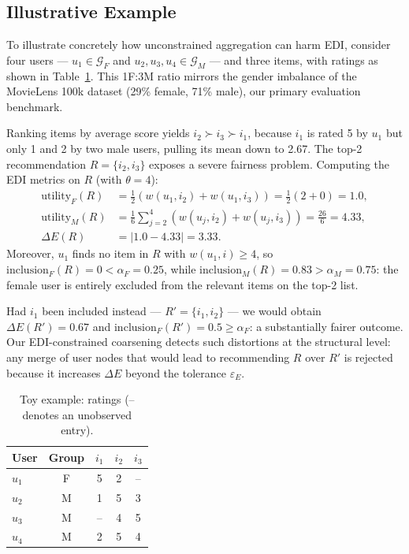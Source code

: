 \documentclass[a4paper,fleqn]{cas-dc}
\begin{document}
\subsection{Illustrative Example}

To illustrate concretely how unconstrained aggregation can harm EDI, consider
four users — $u_1 \in \mathcal{G}_F$ and $u_2, u_3, u_4 \in \mathcal{G}_M$
— and three items, with ratings as shown in Table~\ref{tab:toy}. This 1F:3M ratio mirrors the gender imbalance of the MovieLens 100k dataset
(29\% female, 71\% male), our primary evaluation benchmark.


Ranking items by average score yields $i_2 \succ i_3 \succ i_1$, because $i_1$
is rated 5 by $u_1$ but only 1 and 2 by two male users, pulling its mean down
to 2.67. The top-2 recommendation $R = \{i_2, i_3\}$ exposes a severe fairness
problem. Computing the EDI metrics on $R$ (with $\theta = 4$):
\begin{align*}
  \mathrm{utility}_F(R) &= \tfrac{1}{2}(w(u_1,i_2)+w(u_1,i_3))
                         = \tfrac{1}{2}(2+0) = 1.0, \\
  \mathrm{utility}_M(R) &= \tfrac{1}{6}\sum_{j=2}^{4}(w(u_j,i_2)+w(u_j,i_3))
                         = \tfrac{26}{6} = 4.33, \\
  \Delta E(R) &= |1.0 - 4.33| = 3.33.
\end{align*}
Moreover, $u_1$ finds no item in $R$ with $w(u_1,i) \geq 4$, so
$\mathrm{inclusion}_F(R) = 0 < \alpha_F = 0.25$, while
$\mathrm{inclusion}_M(R) = 0.83 > \alpha_M = 0.75$: the female user is
entirely excluded from the relevant items on the top-2 list.

Had $i_1$ been included instead — $R' = \{i_1, i_2\}$ — we would obtain
$\Delta E(R') = 0.67$ and $\mathrm{inclusion}_F(R') = 0.5 \geq \alpha_F$: a
substantially fairer outcome. Our EDI-constrained coarsening detects such
distortions at the structural level: any merge of user nodes that would lead
to recommending $R$ over $R'$ is rejected because it increases $\Delta E$
beyond the tolerance $\varepsilon_E$.

\begin{table}[H]
\centering
\caption{Toy example: ratings (-- denotes an unobserved entry).}
\label{tab:toy}
\begin{tabular}{lcccc}
\hline
User & Group & $i_1$ & $i_2$ & $i_3$ \\
\hline
$u_1$ & F & 5  & 2  & --  \\
$u_2$ & M & 1  & 5  & 3   \\
$u_3$ & M & -- & 4  & 5   \\
$u_4$ & M & 2  & 5  & 4   \\
\hline
\end{tabular}
\end{table}
\end{document}
